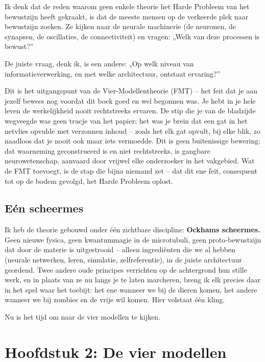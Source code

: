 \documentclass[11pt, twoside, openright]{book}
\begin{document}
Ik denk dat de reden waarom geen enkele theorie het Harde Probleem van het bewustzijn heeft gekraakt, is dat de meeste mensen op de verkeerde plek naar bewustzijn zoeken. Ze kijken naar de neurale machinerie (de neuronen, de synapsen, de oscillaties, de connectiviteit) en vragen: „Welk van deze processen is bewust?”

De juiste vraag, denk ik, is een andere: „Op welk niveau van informatieverwerking, en met welke architectuur, ontstaat ervaring?”

Dit is het uitgangspunt van de Vier-Modellentheorie (FMT) -- het feit dat je aan jezelf bewees nog voordat dit boek goed en wel begonnen was. Je hebt in je hele leven de werkelijkheid nooit rechtstreeks ervaren. De stip die je van de bladzijde wegveegde was geen trucje van het papier; het was je brein dat een gat in het netvlies opvulde met verzonnen inhoud -- zoals het elk gat opvult, bij elke blik, zo naadloos dat je nooit ook maar iets vermoedde. Dit is geen buitenissige bewering: dat waarneming geconstrueerd is en niet rechtstreeks, is gangbare neurowetenschap, aanvaard door vrijwel elke onderzoeker in het vakgebied. Wat de FMT toevoegt, is de stap die bijna niemand zet -- dat dit ene feit, consequent tot op de bodem gevolgd, het Harde Probleem oplost.

\section*{Eén scheermes}

Ik heb de theorie gebouwd onder één zichtbare discipline: \textbf{Ockhams scheermes.} Geen nieuwe fysica, geen kwantummagie in de microtubuli, geen proto-bewustzijn dat door de materie is uitgestrooid -- alleen ingrediënten die we al hebben (neurale netwerken, leren, simulatie, zelfreferentie), in de juiste architectuur geordend. Twee andere oude principes verrichten op de achtergrond hun stille werk, en in plaats van ze nu langs je te laten marcheren, breng ik elk precies daar in het spel waar het toebijt: het ene wanneer we bij de dieren komen, het andere wanneer we bij zombies en de vrije wil komen. Hier volstaat één kling.

Nu is het tijd om naar de vier modellen te kijken.


\chapter*{Hoofdstuk 2: De vier modellen}
\end{document}
